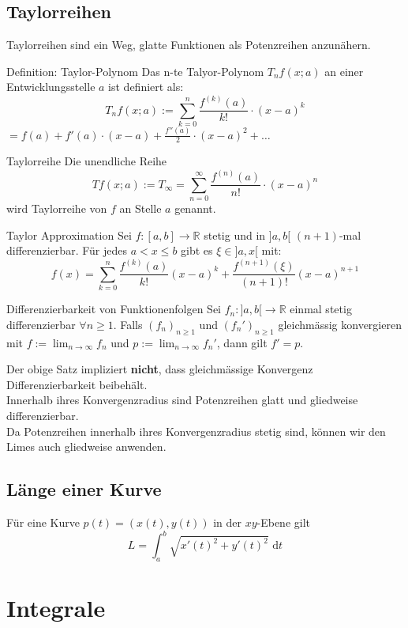 \documentclass[a4paper,10pt]{article}
\def\limn{\lim_{n\to \infty}}
\def\sumn{\sum_{n=0}^\infty}
\begin{document}
\subsection{Taylorreihen}
Taylorreihen sind ein Weg, glatte Funktionen als Potenzreihen anzunähern.

\begin{subbox}{Definition: Taylor-Polynom}
 Das n-te Talyor-Polynom $T_n f(x; a)$ an einer Entwicklungsstelle $a$ ist definiert als:
 $$T_n f(x; a) := \sum_{k=0}^{n} \frac{f^{(k)} (a)}{k!} \cdot (x - a)^k$$ 
 $ = f(a) + f'(a) \cdot (x-a) + \frac{f''(a)}{2} \cdot (x - a)^2 + \ldots$
\end{subbox}
\begin{mainbox}{Taylorreihe}
 Die unendliche Reihe
 $$Tf(x;a) := T_\infty = \sumn \frac{f^{(n)}(a)}{n!} \cdot (x-a)^n$$
 wird Taylorreihe von $f$ an Stelle $a$ genannt.
\end{mainbox}
\begin{subbox}{Taylor Approximation}
  Sei $f: [a, b] \to \mathbb{R}$ stetig und in $]a, b[$ $(n+1)$-mal differenzierbar. Für jedes $a < x \leq b$ gibt es $\xi \in ]a, x[$ mit:\\
  $$f(x) = \sum_{k=0}^n \frac{f^{(k)}(a)}{k!} (x - a)^k + \frac{f^{(n+1)}(\xi)}{(n + 1)!} (x - a)^{n + 1}$$
\end{subbox}
\begin{subbox}{Differenzierbarkeit von Funktionenfolgen}
  Sei $f_n: ]a, b[ \to \mathbb{R}$ einmal stetig differenzierbar $\forall n \geq 1$. Falls $(f_n)_{n \geq 1}$ und $(f_n')_{n \geq 1}$ gleichmässig konvergieren mit $f := \limn f_n$ und $p := \limn f_n'$, dann gilt $f' = p$.  
\end{subbox}
Der obige Satz impliziert \textbf{nicht}, dass gleichmässige Konvergenz Differenzierbarkeit beibehält.\\
Innerhalb ihres Konvergenzradius sind Potenzreihen glatt und gliedweise differenzierbar.\\
Da Potenzreihen innerhalb ihres Konvergenzradius stetig sind, können wir den Limes auch gliedweise anwenden.

\subsection{Länge einer Kurve}
Für eine Kurve $p(t) = (x(t), y(t))$ in der $xy$-Ebene gilt 
$$L = \int_a^b \sqrt{x'(t)^2+ y'(t)^2} \text{ d}t$$

\section{Integrale}
\end{document}
